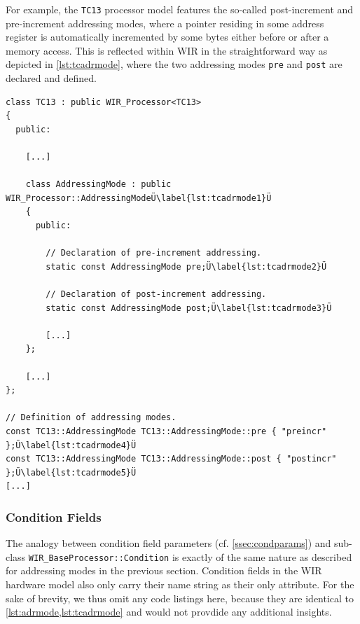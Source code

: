 For example, the \texttt{TC13} processor model features the so-called post-increment and pre-increment addressing modes, where a pointer residing in some address register is automatically incremented by some bytes either before or after a memory access.
This is reflected within \gls{WIR} in the straightforward way as depicted in \cref{lst:tcadrmode}, where the two addressing modes \texttt{pre} and \texttt{post} are declared and defined.

\begin{lstlisting}[style=code,float=t,caption={Concrete Addressing Mode Handling (here for Class \texttt{TC13})},label=lst:tcadrmode]
class TC13 : public WIR_Processor<TC13>
{
  public:

    [...]

    class AddressingMode : public WIR_Processor::AddressingModeÜ\label{lst:tcadrmode1}Ü
    {
      public:

        // Declaration of pre-increment addressing.
        static const AddressingMode pre;Ü\label{lst:tcadrmode2}Ü

        // Declaration of post-increment addressing.
        static const AddressingMode post;Ü\label{lst:tcadrmode3}Ü

        [...]
    };

    [...]
};

// Definition of addressing modes.
const TC13::AddressingMode TC13::AddressingMode::pre { "preincr" };Ü\label{lst:tcadrmode4}Ü
const TC13::AddressingMode TC13::AddressingMode::post { "postincr" };Ü\label{lst:tcadrmode5}Ü
[...]
\end{lstlisting}


\subsubsection{Condition Fields}
\label{sssec:cond}

The analogy between condition field parameters (cf. \cref{ssec:condparams}) and sub-class \texttt{WIR\_BaseProcessor::Condi\-tion} is exactly of the same nature as described for addressing modes in the previous section.
Condition fields in the \gls{WIR} hardware model also only carry their name string as their only attribute.
For the sake of brevity, we thus omit any code listings here, because they are identical to \cref{lst:adrmode,lst:tcadrmode} and would not provdide any additional insights.



